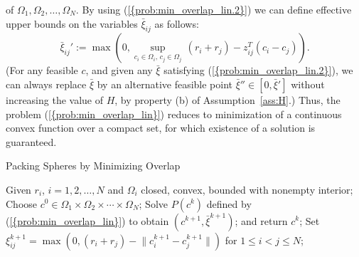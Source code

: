 \documentclass{siamltex}
\providecommand{\norm}[1]{\lVert#1\rVert}
\begin{document}
of $\Omega_1,\Omega_2,\dotsc,\Omega_N$. By using
{(\ref{{prob:min_overlap_lin.2}})} we can define effective upper bounds on
the variables $\bar{\xi}_{ij}$ as follows:
\[
\bar{\xi}_{ij}' := \max  \left( 0,
\sup_{c_i \in \Omega_i, \, c_j \in \Omega_j} \,
(r_i + r_j) - z_{ij}^T (c_i - c_j) \right).
\] 
(For any feasible $c$, and given any $\bar{\xi}$ satisfying
{(\ref{{prob:min_overlap_lin.2}})}, we can always replace $\bar{\xi}$ by
an alternative feasible point $\bar{\xi}'' \in [0,\bar{\xi}']$ without
increasing the value of $H$, by property (b) of
Assumption~\ref{ass:H}.) Thus, the problem
{(\ref{{prob:min_overlap_lin}})} reduces to minimization of a continuous
convex function over a compact set, for which existence of a solution
is guaranteed.

\begin{algorithm}[h]
\caption{Packing Spheres by Minimizing Overlap\label{alg:circ}}
\begin{algorithmic}
\STATE Given $r_i$, $i=1,2,\dotsc,N$ and $\Omega_i$ closed, convex, bounded with nonempty interior;
\STATE Choose $c^0 \in \Omega_1 \times \Omega_2 \times \cdots \times \Omega_N$;
\STATE Solve $P(c^k)$ defined by {(\ref{{prob:min_overlap_lin}})} 
to obtain $(c^{k+1},\bar{\xi}^{k+1})$;
 and return $c^k$;
\ENDIF
\STATE Set $\xi_{ij}^{k+1} = \max(0, (r_i+r_j)-\norm{c_i^{k+1}-c_j^{k+1}} )$ for $1\le i < j \le N$;
\ENDFOR
\end{algorithmic}
\end{algorithm}
\end{document}
